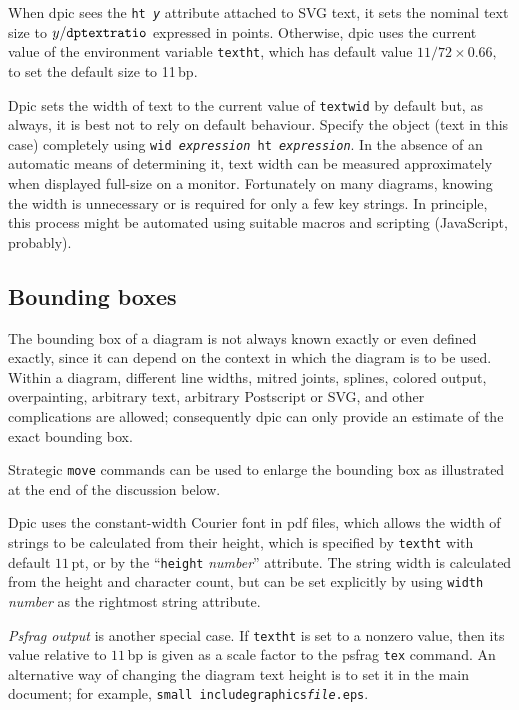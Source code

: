 \documentclass[11pt]{article}
\newcommand{\bq}{}
\newcommand{\Dpic}{{\bq Dpic}\xspace}
\newcommand{\Postscript}{{\bq Postscript}\xspace}
\newcommand{\dpic}{{\bq dpic}\xspace}
\newcommand{\tBS}{{\tt\char92}}
\newcommand{\tLB}{{\tt\char123}}
\newcommand{\tRB}{{\tt\char125}}
\begin{document}
  When \dpic sees the {\tt ht {\it y}} attribute attached to SVG text,
  it sets the nominal text size
  to $y/\tt{dptextratio}$ expressed in points.
  Otherwise, \dpic uses the current value of the environment
  variable {\tt textht}, which has default value $11/72 \times 0.66,$
  to set the default size to 11\,bp.

  \Dpic sets the width of text
  to the current value of {\tt textwid} by default but,
  as always, it is best not to rely on
  default behaviour. Specify the object (text in this case) completely
  using {\tt wid {\it expression} ht {\it expression}}.
  In the absence of an automatic means of determining it, text width can
  be measured approximately when displayed full-size on a monitor.
  Fortunately on many diagrams, knowing the width is unnecessary or
  is required for only a few key strings.
  In principle, this process might be automated using suitable macros
  and scripting (JavaScript, probably).

\subsection{Bounding boxes}
  The bounding box of a diagram is not always known exactly or even defined
  exactly, since it can depend on the context in which the diagram is to be
  used.  Within a diagram, different line widths, mitred joints, splines,
  colored output, overpainting, arbitrary text, arbitrary \Postscript or SVG,
  and other complications are allowed; consequently dpic can only provide an
  estimate of the exact bounding box.

  Strategic {\tt move} commands can be used
  to enlarge the bounding box as illustrated at the end of the discussion
  below.

  Dpic uses the constant-width Courier font in pdf files, which allows
  the width of strings to be calculated from their height, which is
  specified by {\tt textht} with default $11\,$pt, or by the
  ``{\tt height} {\sl number}'' attribute.  The string width is calculated
  from the height and character count, but can be set explicitly
  by using {\tt width} {\sl number} as the rightmost string attribute.

  {\em Psfrag output} is another special case.  If {\tt textht} is set to a
  nonzero value, then its value relative to $11\,$bp is
  given as a scale factor to the psfrag {\tt \tBS{}tex} command.
  An alternative way of changing the diagram text height is to set it in
  the main document; for example,
  {\tt \tLB\tBS{}small \tBS{}includegraphics\tLB{\sl file}.eps\tRB\tRB}.
\end{document}
